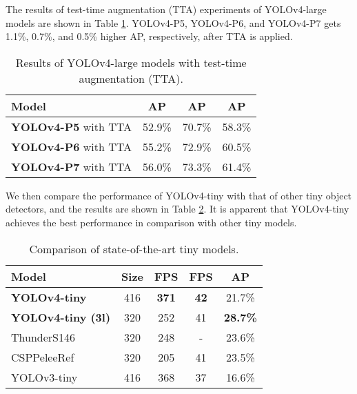 \documentclass[10pt,twocolumn,letterpaper]{article}
\begin{document}
The results of test-time augmentation (TTA) experiments of YOLOv4-large models are shown in Table \ref{table:t13}. YOLOv4-P5, YOLOv4-P6, and YOLOv4-P7 gets 1.1\%, 0.7\%, and 0.5\% higher AP, respectively, after TTA is applied.

\begin{table}[h]
	\centering
	\begin{threeparttable}[h]
		\footnotesize
		\caption{Results of YOLOv4-large models with test-time augmentation (TTA).}
		\label{table:t13}
		\setlength\tabcolsep{3.5pt}
		\begin{tabular}{lccc}
			\toprule
			\textbf{Model} & \textbf{AP} & \textbf{AP} & \textbf{AP} \\				
			\midrule
			\textbf{YOLOv4-P5} with TTA & 52.9\% & 70.7\% & 58.3\% \\
			\textbf{YOLOv4-P6} with TTA & 55.2\% & 72.9\% & 60.5\% \\
			\textbf{YOLOv4-P7} with TTA & 56.0\% & 73.3\% & 61.4\% \\
			\bottomrule
		\end{tabular}
	\end{threeparttable}
\end{table}

We then compare the performance of YOLOv4-tiny with that of other tiny object detectors, and the results are shown in Table \ref{table:t14}.  It is apparent that YOLOv4-tiny achieves the best performance in comparison with other tiny models.

\begin{table}[h]
	\centering
	\begin{threeparttable}[h]
		\footnotesize
		\caption{Comparison of state-of-the-art tiny models.}
		\label{table:t14}
		\setlength\tabcolsep{3.5pt}
		\begin{tabular}{lcccc}
			\toprule
			\textbf{Model} & \textbf{Size} & \textbf{FPS} & \textbf{FPS} & \textbf{AP} \\				
			\midrule
			\textbf{YOLOv4-tiny} & 416 & \textbf{371} & \textbf{42} & 21.7\% \\
			\textbf{YOLOv4-tiny (3l)} & 320 & 252 & 41 & \textbf{28.7\%} \\
			ThunderS146 \cite{qin2019thundernet} & 320 & 248 & - & 23.6\% \\
CSPPeleeRef \cite{wang2020cspnet} & 320 & 205 & 41 & 23.5\% \\
			YOLOv3-tiny \cite{redmon2018yolov3} & 416 & 368 & 37 & 16.6\% \\
			\bottomrule
		\end{tabular}
	\end{threeparttable}
\end{table}
\end{document}

